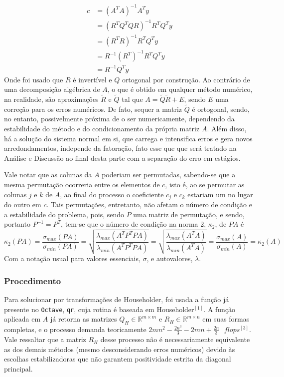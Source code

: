 \documentclass[a4paper, 12pt]{article}
\newcommand*\R{\mathbb{R}}
\begin{document}
\begin{align}
\label{eqn:nor}
c&=(A^TA)^{-1}A^Ty \nonumber \\
&=(R^TQ^TQR)^{-1}R^TQ^Ty \nonumber \\
&=(R^TR)^{-1}R^TQ^Ty \nonumber \\
&=R^{-1}(R^T)^{-1}R^TQ^Ty \nonumber \\
&=R^{-1}Q^Ty
\end{align}
Onde foi usado que $R$ é invertível e $Q$ ortogonal por construção. Ao contrário de uma decomposição algébrica de $A$, o que é obtido em qualquer método numérico, na realidade, são aproximações $\tilde{R}$ e $\tilde{Q}$ tal que $A=\tilde{Q}\tilde{R}+E$, sendo $E$ uma correção para os erros numéricos. De fato, sequer a matriz $\tilde{Q}$ é ortogonal, sendo, no entanto, possivelmente próxima de o ser numericamente, dependendo da estabilidade do método e do condicionamento da própria matriz $A$. Além disso, há a solução do sistema normal em si, que carrega e intensifica erros e gera novos arredondamentos, independe da fatoração, fato esse que que será tratado na Análise e Discussão ao final desta parte com a separação do erro em estágios. 

Vale notar que as colunas da $A$ poderiam ser permutadas, sabendo-se que a mesma permutação ocorreria entre os elementos de $c$, isto é, ao se permutar as colunas $j$ e $k$ de $A$, ao final do processo o coeficiente $c_j$ e $c_k$ estariam um no lugar do outro em $c$. Tais permutações, entretanto, não afetam o número de condição e a estabilidade do problema, pois, sendo $P$ uma matriz de permutação, e sendo, portanto $P^{-1}=P^T$, tem-se que o número de condição na norma 2, $\kappa_2$, de $PA$ é
\[
\kappa_2(PA)=\frac{\sigma_{max}(PA)}{\sigma_{min}(PA)}=\sqrt{\frac{\lambda_{max}(A^TP^TPA)}{\lambda_{min}(A^TP^TPA)}}=\sqrt{\frac{\lambda_{max}(A^TA)}{\lambda_{min}(A^TA)}}=\frac{\sigma_{max}(A)}{\sigma_{min}(A)}=\kappa_2(A)
\]
Com a notação usual para valores essenciais, $\sigma$, e autovalores, $\lambda$.

\subsubsection{Procedimento}
Para solucionar por transformações de Householder, foi usada a função já presente no \verb+Octave+, \verb+qr+, cuja rotina é baseada em Householder$^{[1]}$. A função aplicada em $A$ já retorna as matrizes $Q_H\in \R^{m\times m}$ e $R_H\in \R^{m\times n}$ em suas formas completas, e o processo demanda teoricamente $2mn^2-\frac{2n^3}{3}-2mn+\frac{2n}{3}\text{ }flops^{[3]}$. Vale ressaltar que a matriz $R_H$ desse processo não é necessariamente equivalente as dos demais métodos (mesmo desconsiderando erros numéricos) devido às escolhas estabilizadoras que não garantem positividade estrita da diagonal principal.
 
\end{document}
